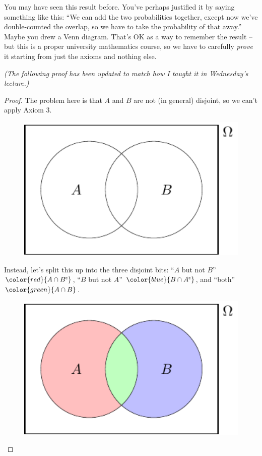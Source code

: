 \documentclass[
  letterpaper,
]{report}
\theoremstyle{definition}
\theoremstyle{definition}
\theoremstyle{remark}
\begin{document}
You may have seen this result before. You've perhaps justified it by
saying something like this: ``We can add the two probabilities together,
except now we've double-counted the overlap, so we have to take the
probability of that away.'' Maybe you drew a Venn diagram. That's OK as
a way to remember the result -- but this is a proper university
mathematics course, so we have to carefully \emph{prove} it starting
from just the axioms and nothing else.

\emph{(The following proof has been updated to match how I taught it in
Wednesday's lecture.)}

\begin{proof}

The problem here is that \(A\) and \(B\) are not (in general) disjoint,
so we can't apply Axiom 3.

\begin{figure}

{\centering \includegraphics[width=4.44444in,height=\textheight]{sections/L04-probability_files/figure-pdf/add3-1.pdf}

}

\end{figure}

Instead, let's split this up into the three disjoint bits: {``\(A\) but
not \(B\)''} \(\color{red}{A \cap B^\mathsf{c}}\), {``\(B\) but not
\(A\)''} \(\color{blue}{B \cap A^\mathsf{c}}\), and {``both''}
\(\color{green}{A \cap B}\).

\begin{figure}

{\centering \includegraphics[width=4.44444in,height=\textheight]{sections/L04-probability_files/figure-pdf/add4-1.pdf}

}
\end{figure}
\end{proof}
\end{document}
